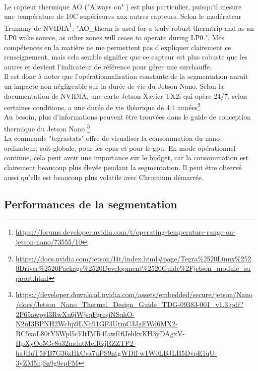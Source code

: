 \vspace{\baselineskip}
\\
\noindent Le capteur thermique AO ("Always on" ) est plus particulier, puisqu'il mesure une température de 10C supérieures aux autres capteurs. Selon le modérateur Trumany de NVIDIA\footnote{\url{https://forums.developer.nvidia.com/t/operating-temperature-range-on-jetson-nano/73555/10}}, "AO\_therm is used for a truly robust thermtrip and as an LP0 wake source, as other zones will cease to operate during LP0.". Mes compétences en la matière ne me permettent pas d'expliquer clairement ce renseignement, mais cela semble signifier que ce capteur est plus robuste que les autres et devient l'indicateur de référence pour gérer une surchauffe. 
\vspace{\baselineskip}
\\
\noindent Il est donc à noter que l'opérationnalisation constante de la segmentation aurait un impacte non négligeable sur la durée de vie du Jetson Nano. Selon la documentation de NVIDIA, une carte Jetson Xavier TX2i qui opère 24/7, selon certaines conditions, a une durée de vie théorique de 4,4 années\footnote{\url{https://docs.nvidia.com/jetson/l4t/index.html#page/Tegra\%2520Linux\%2520Driver\%2520Package\%2520Development\%2520Guide\%2Fjetson_module_support.html}}
\vspace{\baselineskip}
\\
\noindent Au besoin, plus d'informations peuvent être trouvées dans le guide de conception thermique du Jetson Nano \footnote{\url{https://developer.download.nvidia.com/assets/embedded/secure/jetson/Nano/docs/Jetson_Nano_Thermal_Design_Guide_TDG-09383-001_v1.3.pdf?2P65awpyl3RwXu6jWjsqFgresjNSqhO-N2uI3BPNH2Wcbp9LNh91GF3UtmC3JgEWd6MX2-BC5xoL80tY5Wpl5cEltIMR4IawEflJehkxKH3yDAgxV-HpXyOo5Ge8a32mdntMcfRzjRZZTP2-hsJlIuT5FB7G36zHkCva7uPS9ntgWDff-w1W0LBJLH5DvpE1qU-3yZM5hjSz9g9cpFM}}
\vspace{\baselineskip}
\\
\noindent La commande "tegrastats" offre de visualiser la consommation du nano ordinateur, soit globale, pour les \acrshort{cpu}s et pour le \acrshort{gpu}. En mode opérationnel continue, cela peut avoir une importance sur le budget, car la consommation est clairement beaucoup plus élevée pendant la segmentation. Il peut être observé aussi qu'elle est beaucoup plus volatile avec Chromium démarrée. 
\subsection{Performances de la segmentation}
